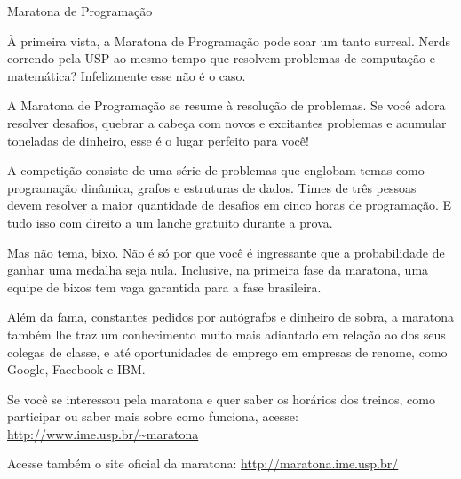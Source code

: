 \begin{secao}{Maratona de Programação}

À primeira vista, a Maratona de Programação pode soar um tanto
surreal. Nerds correndo pela USP ao mesmo tempo que resolvem
problemas de computação e matemática? Infelizmente esse não
é o caso.

A Maratona de Programação se resume à resolução de problemas.
Se você adora resolver desafios, quebrar a cabeça com novos
e excitantes problemas e acumular toneladas de dinheiro, esse
é o lugar perfeito para você!

A competição consiste de uma série de problemas que englobam
temas como programação dinâmica, grafos e estruturas de dados.
Times de três pessoas devem resolver a maior quantidade de
desafios em cinco horas de programação. E tudo isso com direito
a um lanche gratuito durante a prova.

Mas não tema, bixo. Não é só por que você é ingressante que
a probabilidade de ganhar uma medalha seja nula. Inclusive, na primeira 
fase da maratona, uma equipe de bixos tem vaga garantida para a 
fase brasileira.

Além da fama, constantes pedidos por autógrafos e dinheiro de sobra,
a maratona também lhe traz um conhecimento muito mais 
adiantado em relação ao dos seus colegas de classe, e até oportunidades
de emprego em empresas de renome, como Google, Facebook e IBM.

Se você se interessou pela maratona e quer saber os horários dos
treinos, como participar ou saber mais sobre como funciona, acesse: \url{http://www.ime.usp.br/~maratona}

Acesse também o site oficial da maratona: \url{http://maratona.ime.usp.br/}

\end{secao}
